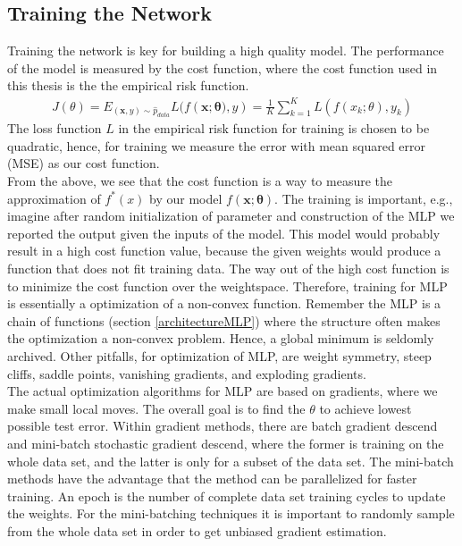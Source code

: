 \subsection{Training the Network}\label{trainNetwork}
Training the network is key for building a high quality model. The performance of the model is measured by the cost function, where the cost function used in this thesis is the the empirical risk function.
\begin{align*}
J(\theta)=E_{(\bm{x},y)\sim \hat{p}_{data}} L(f(\bm{x};\bm{\theta)},y)= \frac{1}{K}\sum_{k=1}^{K} L(f(x_k;\theta),y_k)
\end{align*}
The loss function $L$ in the empirical risk function for training is chosen to be quadratic, hence, for training we measure the error with mean squared error (MSE) as our cost function.\\

From the above, we see that the cost function is a way to measure the approximation of $f^*(x)$ by our model $f(\bm{x};\bm{\theta})$. The training is important, e.g., imagine after random initialization of parameter and construction of the MLP we reported the output given the inputs of the model. This model would probably result in a high cost function value, because the given weights would produce a function that does not fit training data. The way out of the high cost function is to minimize the cost function over the weightspace. Therefore, training for MLP is essentially a optimization of a non-convex function. Remember the MLP is a chain of functions (section \ref{architectureMLP}) where the structure often makes the optimization a non-convex problem. Hence, a global minimum is seldomly archived. Other pitfalls, for optimization of MLP, are weight symmetry, steep cliffs, saddle points, vanishing gradients, and exploding gradients.\\

The actual optimization algorithms for MLP are based on gradients, where we make small local moves. The overall goal is to find the $\theta$ to achieve lowest possible test error. Within gradient methods, there are batch gradient descend and mini-batch stochastic gradient descend, where the former is training on the whole data set, and the latter is only for a subset of the data set. The mini-batch methods have the advantage that the method can be parallelized for faster training. An epoch is the number of complete data set training cycles to update the weights. For the mini-batching techniques it is important to randomly sample from the whole data set in order to get unbiased gradient estimation. \\

